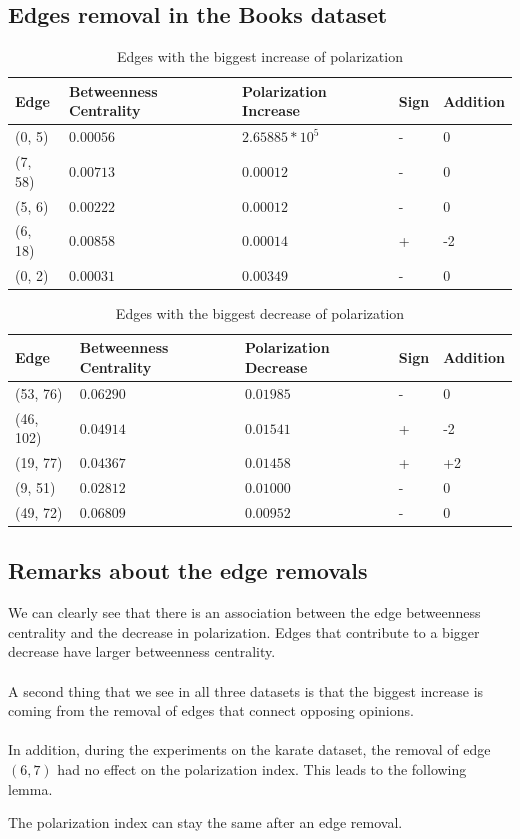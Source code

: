 \subsection{Edges removal in the Books dataset}
\begin{table}[H]
 \centering
 \caption{Edges with the biggest increase of polarization }
 \label{tab:edgesLargest}
 \begin{tabular}{| l || l | l | l | l |}
 \hline
  Edge & Betweenness Centrality & Polarization Increase & Sign & Addition\\
  \hline
  \hline
  (0, 5) & $0.00056$ & $2.65885*10^5$ & - &  0\\
  \hline
  (7, 58) & $0.00713$ & $0.00012$ & - &  0\\
  \hline
  (5, 6) & $0.00222$ & $0.00012$ & - &  0\\
  \hline
  (6, 18) & $0.00858$ & $0.00014$ & +& -2\\
  \hline
  (0, 2) & $0.00031$ & $0.00349$ & - &  0\\
  \hline
 \end{tabular}
\end{table}

\begin{table}[H]
 \centering
 \caption{Edges with the biggest decrease of polarization}
 \label{tab:edgesLargest}
 \begin{tabular}{| l || l | l | l | l |}
 \hline
  Edge & Betweenness Centrality & Polarization Decrease & Sign & Addition\\
  \hline
  \hline
  (53, 76) & $0.06290$ & $0.01985$ & - &  0\\
  \hline
  (46, 102) & $0.04914$ & $0.01541$ & + &  -2\\
  \hline
  (19, 77) & $0.04367$ & $0.01458$ & + &  +2\\
  \hline
  (9, 51) & $0.02812$ & $0.01000$ & - &  0\\
  \hline
  (49, 72) & $0.06809$ & $0.00952$ & - &  0\\
  \hline
 \end{tabular} 
\end{table}

\subsection{Remarks about the edge removals}

We can clearly see that there is an association between the edge betweenness centrality and the decrease in polarization. Edges that contribute to a bigger decrease have larger betweenness centrality. 
\\
\\
A second thing that we see in all three datasets is that the biggest increase is coming from the removal of edges that connect opposing opinions.
\\
\\
In addition, during the experiments on the karate dataset, the removal of edge $(6, 7)$ had no effect on the polarization index. This leads to the following lemma.

\begin{lemma}
The polarization index can stay the same after an edge removal.
\end{lemma}
